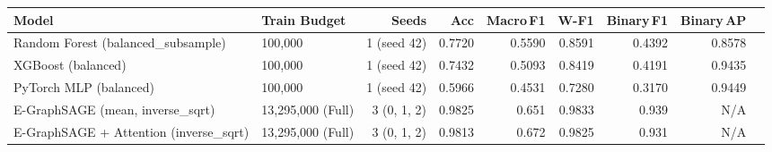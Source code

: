 \begin{tabular}{llrrrrrrr}
  \toprule
  Model & Train Budget & Seeds & Acc & Macro\,F1 & W-F1 & Binary\,F1 & Binary\,AP \\
  \midrule
  Random Forest (balanced\_subsample) & 100,000 & 1 (seed 42) & 0.7720 & 0.5590 & 0.8591 & 0.4392 & 0.8578 \\
  XGBoost (balanced) & 100,000 & 1 (seed 42) & 0.7432 & 0.5093 & 0.8419 & 0.4191 & 0.9435 \\
  PyTorch MLP (balanced) & 100,000 & 1 (seed 42) & 0.5966 & 0.4531 & 0.7280 & 0.3170 & 0.9449 \\
  E-GraphSAGE (mean, inverse\_sqrt) & 13,295,000 (Full) & 3 (0, 1, 2) & 0.9825 & 0.651 & 0.9833 & 0.939 & N/A \\
  E-GraphSAGE + Attention (inverse\_sqrt) & 13,295,000 (Full) & 3 (0, 1, 2) & 0.9813 & 0.672 & 0.9825 & 0.931 & N/A \\
  \bottomrule
\end{tabular}
